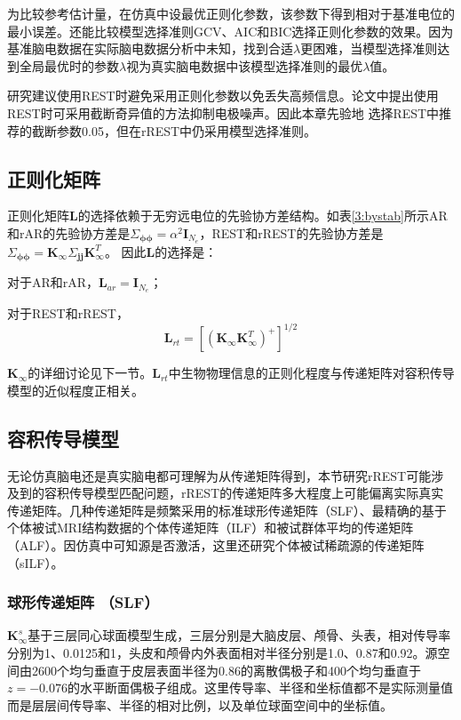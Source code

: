 为比较参考估计量，在仿真中设最优正则化参数，该参数下得到相对于基准电位的最小误差。还能比较模型选择准则GCV、AIC和BIC选择正则化参数的效果。因为基准脑电数据在实际脑电数据分析中未知，找到合适$\lambda$更困难，当模型选择准则达到全局最优时的参数$\lambda$视为真实脑电数据中该模型选择准则的最优$\lambda$值。

研究建议使用REST时避免采用正则化参数以免丢失高频信息。论文中提出使用REST时可采用截断奇异值的方法抑制电极噪声。因此本章先验地
选择REST中推荐的截断参数0.05，但在rREST中仍采用模型选择准则。
\subsection{正则化矩阵}
正则化矩阵$\mathbf{L}$的选择依赖于无穷远电位的先验协方差结构。如表\ref{3:bystab}所示AR和rAR的先验协方差是$\Sigma_{\mathbf{\phi\phi}}=\alpha^{2}\mathbf{I}_{N_e}$，REST和rREST的先验协方差是$\Sigma_{\mathbf{\phi\phi}}=\mathbf{K}_{\infty}\Sigma_{\mathbf{jj}}\mathbf{K}_{\infty}^T$。 因此$\mathbf{L}$的选择是：

对于AR和rAR，$\mathbf{L}_{ar}=\mathbf{I}_{N_e}$；

对于REST和rREST，
\begin{equation}\label{eq3.17}
\mathbf{L}_{rt}=[(\mathbf{K}_\infty\mathbf{K}_\infty^T)^+]^{1/2}
\end{equation}

$\mathbf{K}_\infty$的详细讨论见下一节。$\mathbf{L}_{rt}$中生物物理信息的正则化程度与传递矩阵对容积传导模型的近似程度正相关。
\subsection{容积传导模型}
无论仿真脑电还是真实脑电都可理解为从传递矩阵得到，本节研究rREST可能涉及到的容积传导模型匹配问题，rREST的传递矩阵多大程度上可能偏离实际真实传递矩阵。几种传递矩阵是频繁采用的标准球形传递矩阵（SLF）、最精确的基于个体被试MRI结构数据的个体传递矩阵（ILF）和被试群体平均的传递矩阵（ALF）。因仿真中可知源是否激活，这里还研究个体被试稀疏源的传递矩阵（sILF）。
\subsubsection{球形传递矩阵 （SLF）}
$\mathbf{K}_{\infty}^{s}$基于三层同心球面模型生成，三层分别是大脑皮层、颅骨、头表，相对传导率分别为1、0.0125和1，头皮和颅骨内外表面相对半径分别是1.0、0.87和0.92。源空间由2600个均匀垂直于皮层表面半径为0.86的离散偶极子和400个均匀垂直于$z=-0.076$的水平断面偶极子组成。这里传导率、半径和坐标值都不是实际测量值而是层层间传导率、半径的相对比例，以及单位球面空间中的坐标值。
